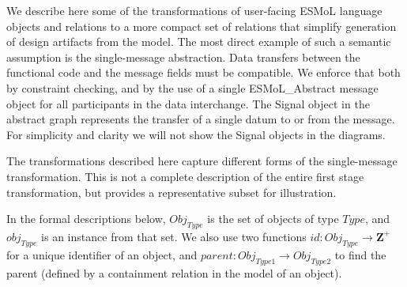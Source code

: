 % 
% 
% 

We describe here some of the transformations of user-facing ESMoL language objects and
relations to a more compact set of relations that simplify generation of design
artifacts from the model.  The most direct example of such a semantic assumption
is the single-message abstraction.  Data transfers between the functional code
and the message fields must be compatible. We enforce that both by constraint
checking, and by the use of a single ESMoL\_Abstract message object for all
participants in the data interchange.  The Signal object in the
abstract graph represents the transfer of a single datum to or from the message.
For simplicity and clarity we will not show the Signal objects in the diagrams.

The transformations described here capture different forms of the
single-message transformation.  This is not a complete description of the
entire first stage transformation, but provides a representative subset for
illustration.

In the formal descriptions below, $Obj_{Type}$ is the set of objects of type $Type$, and
$obj_{Type}$ is an instance from that set.  We also
use two functions $id: Obj_{Type} \rightarrow \mathbf{Z}^{+}$ for a unique
identifier of an object, and $parent: Obj_{Type1} \rightarrow Obj_{Type2}$ to
find the parent (defined by a containment relation in the model of an object).

